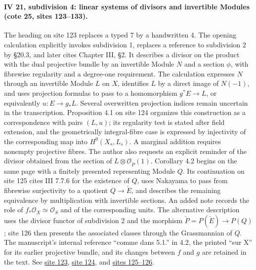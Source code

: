 \paragraph{IV 21, subdivision 4: linear systems of divisors and invertible Modules (cote 25, sites 123--133).}
The heading on site 123 replaces a typed 7 by a handwritten 4. The opening calculation explicitly invokes subdivision 1, replaces a reference to subdivision 2 by \S20.3, and later cites Chapter III, \S2. It describes a divisor on the product with the dual projective bundle by an invertible Module \(N\) and a section \(\phi\), with fibrewise regularity and a degree-one requirement. The calculation expresses \(N\) through an invertible Module \(L\) on \(X\), identifies \(L\) by a direct image of \(N(-1)\), and uses projection formulas to pass to a homomorphism \(g^*E\longrightarrow L\), or equivalently \(u:E\longrightarrow g_*L\). Several overwritten projection indices remain uncertain in the transcription. Proposition 4.1 on site 124 organizes this construction as a correspondence with pairs \((L,u)\); its regularity test is stated after field extension, and the geometrically integral-fibre case is expressed by injectivity of the corresponding map into \(H^0(X_s,L_s)\). A marginal addition requires nonempty projective fibres. The author also requests an explicit reminder of the divisor obtained from the section of \(L\otimes\mathcal O_{\check P}(1)\). Corollary 4.2 begins on the same page with a finitely presented representing Module \(Q\). Its continuation on site 125 cites III 7.7.6 for the existence of \(Q\), uses Nakayama to pass from fibrewise surjectivity to a quotient \(Q\longrightarrow\check E\), and describes the remaining equivalence by multiplication with invertible sections. An added note records the role of \(f_*\mathcal O_X\simeq\mathcal O_S\) and of the corresponding units. The alternative description uses the divisor functor of subdivision 2 and the morphism \(\check P=P(\check E)\longrightarrow P(Q)\); site 126 then presents the associated classes through the Grassmannian of \(Q\). The manuscript's internal reference ``comme dans 5.1.'' in 4.2, the printed ``sur X'' for its earlier projective bundle, and its changes between \(f\) and \(g\) are retained in the text. See \href{https://grothendieck.umontpellier.fr/web/viewer.html?file=../25.pdf#page=124}{site 123}, \href{https://grothendieck.umontpellier.fr/web/viewer.html?file=../25.pdf#page=125}{site 124}, and \href{https://grothendieck.umontpellier.fr/web/viewer.html?file=../25.pdf#page=126}{sites 125--126}.

